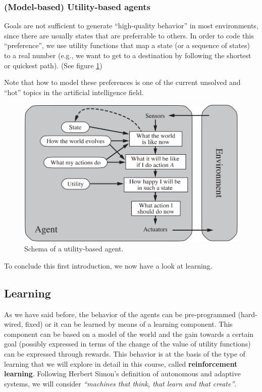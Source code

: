 \subsubsection{(Model-based) Utility-based agents}
Goals are not sufficient to generate “high-quality behavior” in most environments, since there are usually states that are preferrable to others. In order to code this “preference”, we use utility functions that map a state (or a sequence of states) to a real number (e.g., we want to get to a destination by following the shortest or quickest path). (See figure \ref{fig:ch1-utilitybasedagent})

Note that how to model these preferences is one of the current unsolved and “hot” topics in the artificial intelligence field.

\begin{figure}[hbt]
    \centering
    \includegraphics[scale=0.35]{Images/Chapter 1/utility-based-agent.png}
    \caption{Schema of a utility-based agent.}
    \label{fig:ch1-utilitybasedagent}
\end{figure}

To conclude this first introduction, we now have a look at learning.

\subsection{Learning}
As we have said before, the behavior of the agents can be pre-programmed (hard-wired, fixed) or it can be learned by means of a learning component. This component can be based on a model of the world and the gain towards a certain goal (possibly expressed in terms of the change of the value of utility functions) can be expressed through rewards. This behavior is at the basis of the type of learning that we will explore in detail in this course, called \textbf{reinforcement learning}. Following Herbert Simon’s definition of autonomous and adaptive systems, we will consider \textit{``machines that think, that learn and that create''}.